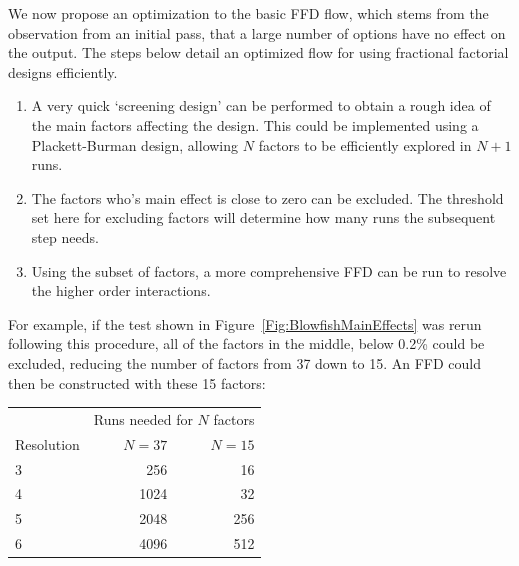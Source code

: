 \documentclass[twocolumn]{article}
\begin{document}
We now propose an optimization to the basic FFD flow, which stems from the observation from an initial pass, that a large number of options have no effect on the output. The steps below detail an optimized flow for using fractional factorial designs efficiently.
\begin{enumerate}
	\setlength{\itemsep}{0em}
	\vspace{-1mm}
	\item A very quick `screening design' can be performed to obtain a rough idea of the main factors affecting the design. This could be implemented using a Plackett-Burman design\cite{Bose1940}, allowing $N$ factors to be efficiently explored in $N+1$ runs.
	\item The factors who's main effect is close to zero can be excluded. The threshold set here for excluding factors will determine how many runs the subsequent step needs.
	\item Using the subset of factors, a more comprehensive FFD can be run to resolve the higher order interactions.
\end{enumerate}

For example, if the test shown in Figure~\ref{Fig:BlowfishMainEffects} was rerun following this procedure, all of the factors in the middle, below 0.2\% could be excluded, reducing the number of factors from 37 down to 15. An FFD could then be constructed with these 15 factors:

\begin{center}
\begin{tabular}{l r r}
	& \multicolumn{2}{c}{Runs needed for $N$ factors} \\
	Resolution & \hspace{5mm}$N=37$ & $N=15$ \\
	\hline
	3 & 256	   & 16 \\
	4 & 1024   & 32 \\
	5 & 2048   & 256 \\
	6 & 4096   & 512 \\
\end{tabular}
\end{center}
\end{document}
